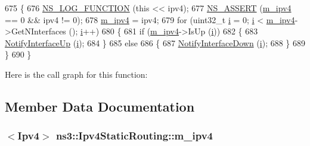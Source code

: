 \begin{DoxyCode}
675 \{
676   \hyperlink{log-macros-disabled_8h_a90b90d5bad1f39cb1b64923ea94c0761}{NS\_LOG\_FUNCTION} (\textcolor{keyword}{this} << ipv4);
677   \hyperlink{assert_8h_a6dccdb0de9b252f60088ce281c49d052}{NS\_ASSERT} (\hyperlink{classns3_1_1Ipv4StaticRouting_adc30356be1824ea40ffbd444a5d91b9f}{m\_ipv4} == 0 && ipv4 != 0);
678   \hyperlink{classns3_1_1Ipv4StaticRouting_adc30356be1824ea40ffbd444a5d91b9f}{m\_ipv4} = ipv4;
679   \textcolor{keywordflow}{for} (uint32\_t \hyperlink{bernuolliDistribution_8m_a6f6ccfcf58b31cb6412107d9d5281426}{i} = 0; \hyperlink{bernuolliDistribution_8m_a6f6ccfcf58b31cb6412107d9d5281426}{i} < \hyperlink{classns3_1_1Ipv4StaticRouting_adc30356be1824ea40ffbd444a5d91b9f}{m\_ipv4}->GetNInterfaces (); \hyperlink{bernuolliDistribution_8m_a6f6ccfcf58b31cb6412107d9d5281426}{i}++)
680     \{
681       \textcolor{keywordflow}{if} (\hyperlink{classns3_1_1Ipv4StaticRouting_adc30356be1824ea40ffbd444a5d91b9f}{m\_ipv4}->IsUp (\hyperlink{bernuolliDistribution_8m_a6f6ccfcf58b31cb6412107d9d5281426}{i}))
682         \{
683           \hyperlink{classns3_1_1Ipv4StaticRouting_a2c84913a130adb6dbd2814da95e789fb}{NotifyInterfaceUp} (\hyperlink{bernuolliDistribution_8m_a6f6ccfcf58b31cb6412107d9d5281426}{i});
684         \}
685       \textcolor{keywordflow}{else}
686         \{
687           \hyperlink{classns3_1_1Ipv4StaticRouting_a22f00ba2dabe60e0653e278e221aa97b}{NotifyInterfaceDown} (\hyperlink{bernuolliDistribution_8m_a6f6ccfcf58b31cb6412107d9d5281426}{i});
688         \}
689     \}
690 \}
\end{DoxyCode}


Here is the call graph for this function\+:




\subsection{Member Data Documentation}
\subsubsection[{\texorpdfstring{m\+\_\+ipv4}{m_ipv4}}]{$<${\bf Ipv4}$>$ ns3\+::\+Ipv4\+Static\+Routing\+::m\+\_\+ipv4\hspace{0.3cm}{\ttfamily [private]}}\hypertarget{classns3_1_1Ipv4StaticRouting_adc30356be1824ea40ffbd444a5d91b9f}{}\label{classns3_1_1Ipv4StaticRouting_adc30356be1824ea40ffbd444a5d91b9f}


